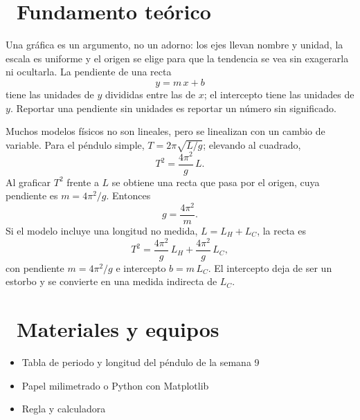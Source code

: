 \documentclass[11pt,a4paper]{article}
\newcommand{\iconotexto}[2]{\textcolor{cyanNeon}{\faIcon{#1}}~#2}
\begin{document}
\section{\iconotexto{book-open}{Fundamento teórico}}

Una gráfica es un argumento, no un adorno: los ejes llevan nombre y
unidad, la escala es uniforme y el origen se elige para que la tendencia
se vea sin exagerarla ni ocultarla. La pendiente de una recta
\[
  y = m\,x + b
\]
tiene las unidades de $y$ divididas entre las de $x$; el intercepto tiene
las unidades de $y$. Reportar una pendiente sin unidades es reportar un
número sin significado.

Muchos modelos físicos no son lineales, pero se linealizan con un cambio
de variable. Para el péndulo simple, $T = 2\pi\sqrt{L/g}$; elevando al
cuadrado,
\[
  T^2 = \frac{4\pi^2}{g}\,L.
\]
Al graficar $T^2$ frente a $L$ se obtiene una recta que pasa por el
origen, cuya pendiente es $m = 4\pi^2/g$. Entonces
\[
  g = \frac{4\pi^2}{m}.
\]
Si el modelo incluye una longitud no medida, $L = L_H + L_C$, la recta es
\[
  T^2 = \frac{4\pi^2}{g}\,L_H + \frac{4\pi^2}{g}\,L_C,
\]
con pendiente $m = 4\pi^2/g$ e intercepto $b = m\,L_C$. El intercepto deja
de ser un estorbo y se convierte en una medida indirecta de $L_C$.

\begin{center}
\par{}
\end{center}

\section{\iconotexto{box-open}{Materiales y equipos}}

\begin{itemize}[leftmargin=1.4em,itemsep=2pt,topsep=3pt]
  \item Tabla de periodo y longitud del péndulo de la semana 9
  \item Papel milimetrado o Python con Matplotlib
  \item Regla y calculadora
\end{itemize}
\end{document}
